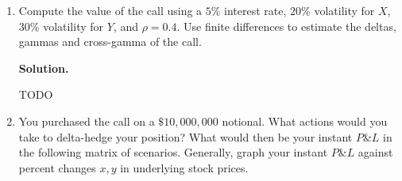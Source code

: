 \documentclass[12pt]{article}
\newenvironment{solution}{\vspace{0.2cm} \textbf{Solution.}}{}
\begin{document}
\begin{enumerate}[label=(\alph*)]
\begin{solution}
			
			In our case, we assume no dividend ($\mu_1 = \mu_2 = 0$) and $\alpha =\frac{1}{2}$, so the dynamics of $V_t$ simplifies to:
			\begin{dmath*}
			dV_t = \left(r - \frac{1}{4} \left(\sigma_1^2 + \sigma_2^2\right)\right) V_t dt + \frac{1}{2} V_t \left( \sigma_1 dW_t + \sigma_2 \left(\rho dW_t + \sqrt{1 - \rho^2}dZ_t \right)\right)
			\end{dmath*}
			
			If we call $dB_t = \frac{\sigma_1 dW_t + \sigma_2 \left(\rho dW_t + \sqrt{1 - \rho^2}dZ_t \right)}{\sigma_{X,Y}}$, where again $\sigma_{X,Y} = \sqrt{\sigma_1^2 + \sigma_2^2 + 2\rho \sigma_1 \sigma_2}$, $B_t$ is a Brownian and we have:
			\begin{dmath*}
			dV_t = \left(r - \frac{1}{4} \left(\sigma_1^2 + \sigma_2^2\right)\right) V_t dt + \frac{1}{2} \sigma_{X,Y} V_t dB_t
			\end{dmath*}

			Under this form, we see that $V_t = \sqrt{X_t Y_t}$ follows a lognormal distribution.
			
			Therefore, the price of the option is given by the following Black-Scholes formula:
			$$ f_t = \frac{1}{\sqrt{X_0 Y_0}} \left(\sqrt{X_t Y_t} N(d_1^*) + \sqrt{X_0 Y_0} e^{-r(T-t)}N(d_2^*)\right)$$
			where
			\begin{align*}
			d_1^*(K) &= \frac{1}{\sqrt{\sigma_1^2 + \sigma_2^2 + 2\rho \sigma_1 \sigma_2}\sqrt{T - t}}\left[\ln\left(\frac{\sqrt{X_t Y_t}}{\sqrt{X_0 Y_0}}\right) + \left(r + \frac{\sigma_1^2 + \sigma_2^2 + 2\rho \sigma_1 \sigma_2}{2}\right)(T - t)\right] \\
			d_2^*(K) &= d_1^* - \frac{1}{2} \sqrt{\sigma_1^2 + \sigma_2^2 + 2\rho \sigma_1 \sigma_2} \sqrt{T - t}
			\end{align*}
			
			
			
		\end{solution}
		
		\item Compute the value of the call using a $5\%$ interest rate, $20\%$ volatility for $X$, $30\%$ volatility for $Y$, and $\rho = 0.4$. Use finite differences to estimate the deltas, gammas and cross-gamma of the call.
		
		\begin{solution}
			
			TODO
			
		\end{solution}
		
		\item You purchased the call on a $\$10,000,000$ notional. What actions would you take to delta-hedge your position? What would then be your instant $P\&L$ in the following matrix of scenarios. Generally, graph your instant $P\&L$ against percent changes $x, y$ in underlying stock prices.
		

\end{enumerate}
\end{document}
